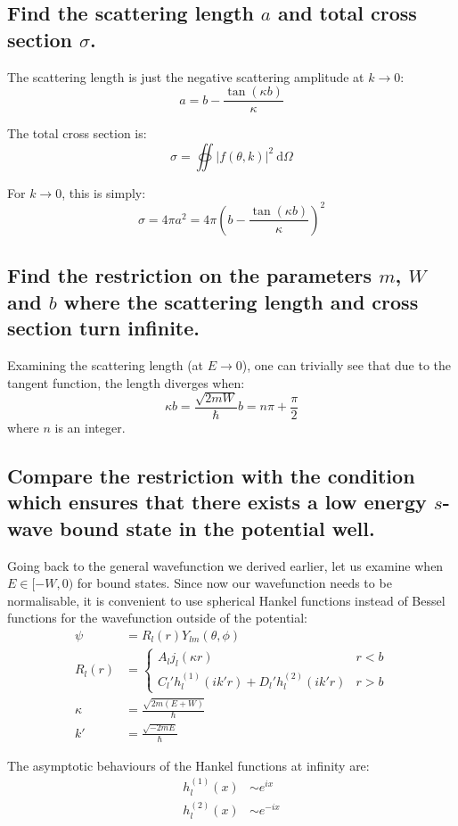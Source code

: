 \documentclass[a4paper]{scrartcl}
\begin{document}
\subsection{Find the scattering length \(a\) and total cross section \(\sigma\).}
The scattering length is just the negative scattering amplitude at \(k \to 0\):
\[a = b - \frac{\tan (\kappa b)}{\kappa}\]

The total cross section is:
\[\sigma = \oiint |f(\theta, k)|^2 \:\mathrm{d} \Omega\]

For \(k \to 0\), this is simply:
\[\sigma = 4 \pi a^2 = 4 \pi \left(b - \frac{\tan (\kappa b)}{\kappa}\right)^2\]

\subsection{Find the restriction on the parameters \(m\), \(W\) and \(b\) where the scattering length and cross section turn infinite.}
Examining the scattering length (at \(E \to 0\)), one can trivially see that due to the tangent function, the length diverges when:
\[\kappa b = \frac{\sqrt{2 m W}}{\hbar} b = n \pi + \frac{\pi}{2}\]
where \(n\) is an integer.

\subsection{Compare the restriction with the condition which ensures that there exists a low energy \(s\)-wave bound state in the potential well.}
Going back to the general wavefunction we derived earlier, let us examine when \(E \in [-W, 0)\) for bound states. Since now our wavefunction needs to be normalisable, it is convenient to use spherical Hankel functions instead of Bessel functions for the wavefunction outside of the potential:
\begin{align*}
    \psi &= R_l(r) Y_{l m}(\theta, \phi) \\
    R_l(r) &= \begin{cases}
        A_l j_l(\kappa r) & r < b \\
        C_l' h_l^{(1)}(i k' r) + D_l' h_l^{(2)}(i k' r) & r > b
    \end{cases} \\
    \kappa &= \frac{\sqrt{2 m (E + W)}}{\hbar} \\
    k' &= \frac{\sqrt{-2 m E}}{\hbar}
\end{align*}

The asymptotic behaviours of the Hankel functions at infinity are:
\begin{align*}
    h_l^{(1)}(x) &\sim e^{i x} \\
    h_l^{(2)}(x) &\sim e^{-i x}
\end{align*}
\end{document}
